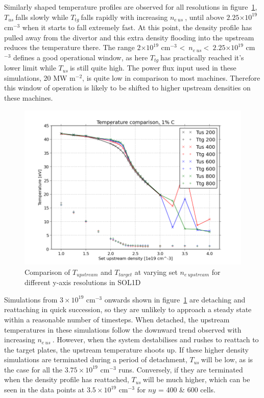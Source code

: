 \documentclass[12pt]{article}  %
\providecommand{\e}[1]{\ensuremath{\times 10^{#1}}} %
\providecommand{\noNe}[1]{{${#1}\times 10^{19}$ cm$^{-3}$}} %
\providecommand{\pow}[1]{{$^{#1}$}} %
\providecommand{\neus}{$n_{e~us}~$} %
\providecommand{\Tus}{$T_{us}~$} %
\providecommand{\Ttg}{$T_{tg}~$} %
\begin{document}
Similarly shaped temperature profiles are observed for all resolutions in figure~\ref{figTT_IMPCOMBO2}, \Tus falls slowly while \Ttg falls rapidly with increasing \neus, until above $2.25\e{19}$ cm$^{-3}$ when it starts to fall extremely fast. At this point, the density profile has pulled away from the divertor and this extra density flooding into the upstream reduces the temperature there. The range $2\e{19}$ cm$^{-3}$ \textless~\neus \textless~$2.25\e{19}$ cm$^{-3}$ defines a good operational window, as here \Ttg has practically reached it's lower limit while \Tus is still quite high. The power flux input used in these simulations, 20 MW m\pow{-2}, is quite low in comparison to most machines. Therefore this window of operation is likely to be shifted to higher upstream densities on these machines.

\begin{figure}
\includegraphics[scale=0.5]{Figures/sol1d/TT_IMPCOMBO2.png}
\centering
\caption{Comparison of $T_{upstream}$ and $T_{target}$ at varying set $n_{e~upstream}$ for different y-axis resolutions in SOL1D}\label{figTT_IMPCOMBO2}
\end{figure}

Simulations from \noNe{3} onwards shown in figure~\ref{figTT_IMPCOMBO2} are detaching and reattaching in quick succession, so they are unlikely to approach a steady state within a reasonable number of timesteps. When detached, the upstream temperatures in these simulations follow the downward trend observed with increasing \neus. However, when the system destabilises and rushes to reattach to the target plates, the upstream temperature shoots up. If these higher density simulations are terminated during a period of detachment, \Tus will be low, as is the case for all the \noNe{3.75} runs. Conversely, if they are terminated when the density profile has reattached, \Tus will be much higher, which can be seen in the data points at \noNe{3.5} for $ny$ = 400 \& 600 cells. 
\end{document}
